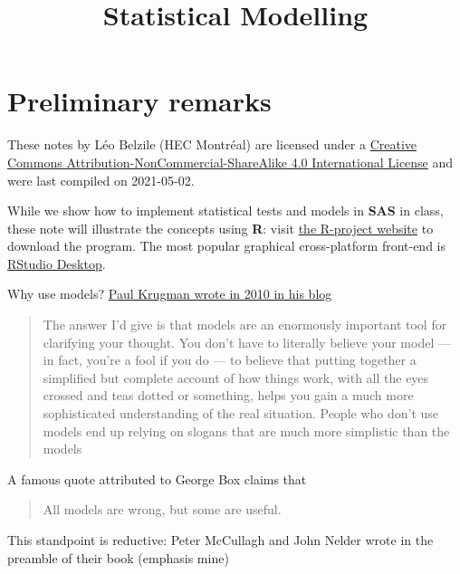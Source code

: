 \documentclass[
  11pt,
  letterpaper,
]{book}
\title{Statistical Modelling}
\author{}
\date{\vspace{-2.5em}}
\let\oldhref\href
\renewcommand{\href}[2]{#2\footnote{\url{#1}}}
\theoremstyle{definition}
\theoremstyle{definition}
\theoremstyle{definition}
\theoremstyle{definition}
\theoremstyle{remark}
\begin{document}
\maketitle

\let\href\oldhref

{
\setcounter{tocdepth}{1}
\tableofcontents
}
\hypertarget{preliminary-remarks}{%
\chapter*{Preliminary remarks}\label{preliminary-remarks}}

These notes by Léo Belzile (HEC Montréal) are licensed under a \href{http://creativecommons.org/licenses/by-nc-sa/4.0/}{Creative Commons Attribution-NonCommercial-ShareAlike 4.0 International License} and were last compiled on 2021-05-02.

While we show how to implement statistical tests and models in \textbf{SAS} in class, these note will illustrate the concepts using \textbf{R}: visit \href{https://cran.r-project.org/}{the R-project website} to download the program. The most popular graphical cross-platform front-end is \href{https://www.rstudio.com/products/rstudio/download/}{RStudio Desktop}.

Why use models? \href{https://krugman.blogs.nytimes.com/2010/11/18/debt-deleveraging-and-the-liquidity-trap/}{Paul Krugman wrote in 2010 in his blog}

\begin{quote}
The answer I'd give is that models are an enormously important tool for clarifying your thought. You don't have to literally believe your model --- in fact, you're a fool if you do --- to believe that putting together a simplified but complete account of how things work, with all the eyes crossed and teas dotted or something, helps you gain a much more sophisticated understanding of the real situation. People who don't use models end up relying on slogans that are much more simplistic than the models
\end{quote}

A famous quote attributed to George Box claims that

\begin{quote}
All models are wrong, but some are useful.
\end{quote}

This standpoint is reductive: Peter McCullagh and John Nelder wrote in the preamble of their book (emphasis mine)
\end{document}
